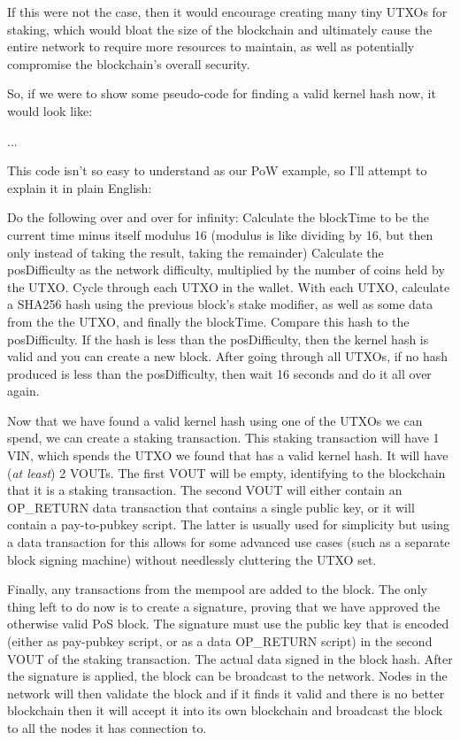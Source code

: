 If this were not the case, then it would encourage creating many tiny UTXOs 
for staking, which would bloat the size of the blockchain and ultimately 
cause the entire network to require more resources to maintain, as well as 
potentially compromise the blockchain's overall security.



So, if we were to show some pseudo-code for finding a valid kernel hash now, 
it would look like:



...



This code isn't so easy to understand as our PoW example, so I'll attempt to 
explain it in plain English:



Do the following over and over for infinity:
Calculate the blockTime to be the current time minus itself modulus 16
(modulus is like dividing by 16, but then only instead of taking the
result, taking the remainder)
Calculate the posDifficulty as the network difficulty, multiplied by the
number of coins held by the UTXO.
Cycle through each UTXO in the wallet. With each UTXO, calculate a SHA256
hash using the previous block's stake modifier, as well as some data from
the the UTXO, and finally the blockTime. Compare this hash to the
posDifficulty. If the hash is less than the posDifficulty, then the kernel
hash is valid and you can create a new block.
After going through all UTXOs, if no hash produced is less than the
posDifficulty, then wait 16 seconds and do it all over again.



Now that we have found a valid kernel hash using one of the UTXOs we can 
spend, we can create a staking transaction. This staking transaction will 
have 1 VIN, which spends the UTXO we found that has a valid kernel hash. 
It will have (\textit{at least}) 2 VOUTs. The first VOUT will be empty, 
identifying to the blockchain that it is a staking transaction. The second 
VOUT will either contain an OP\_RETURN data transaction that contains a single 
public key, or it will contain a pay-to-pubkey script. The latter is usually 
used for simplicity but using a data transaction for this allows for some 
advanced use cases (such as a separate block signing machine) without 
needlessly cluttering the UTXO set.



Finally, any transactions from the mempool are added to the block. The only 
thing left to do now is to create a signature, proving that we have approved 
the otherwise valid PoS block. The signature must use the public key that is 
encoded (either as pay-pubkey script, or as a data OP\_RETURN script) in the 
second VOUT of the staking transaction. The actual data signed in the block 
hash. After the signature is applied, the block can be broadcast to the 
network. Nodes in the network will then validate the block and if it finds 
it valid and there is no better blockchain then it will accept it into its 
own blockchain and broadcast the block to all the nodes it has connection to.



